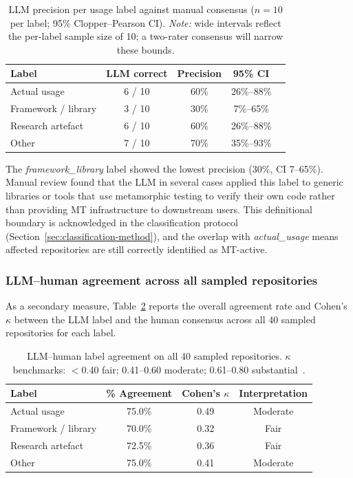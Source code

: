 \begin{table}[h]
\centering
\caption{LLM precision per usage label against manual consensus
         ($n = 10$ per label; 95\% Clopper–Pearson CI).
         \emph{Note:} wide intervals reflect the per-label sample size of 10;
         a two-rater consensus will narrow these bounds.}
\label{tab:llm-precision}
\begin{tabular}{lcccc}
\hline
\textbf{Label} & \textbf{LLM correct} & \textbf{Precision} & \textbf{95\% CI} \\
\hline
Actual usage         & 6 / 10 & 60\% & 26\%–88\% \\
Framework / library  & 3 / 10 & 30\% & 7\%–65\%  \\
Research artefact    & 6 / 10 & 60\% & 26\%–88\% \\
Other                & 7 / 10 & 70\% & 35\%–93\% \\
\hline
\end{tabular}
\end{table}

The \textit{framework\_library} label showed the lowest precision (30\%, CI 7–65\%).
Manual review found that the LLM in several cases applied this label to generic
libraries or tools that \emph{use} metamorphic testing to verify their own code
rather than providing MT infrastructure to downstream users.
This definitional boundary is acknowledged in the classification protocol
(Section~\ref{sec:classification-method}), and the overlap with \textit{actual\_usage}
means affected repositories are still correctly identified as MT-active.

\subsubsection*{LLM–human agreement across all sampled repositories}
As a secondary measure, Table~\ref{tab:llm-agreement} reports the overall agreement
rate and Cohen's~$\kappa$ between the LLM label and the human consensus
across all 40 sampled repositories for each label.

\begin{table}[h]
\centering
\caption{LLM–human label agreement on all 40 sampled repositories.
         $\kappa$ benchmarks: $<$0.40 fair; 0.41–0.60 moderate;
         0.61–0.80 substantial~\cite{landis1977}.}
\label{tab:llm-agreement}
\begin{tabular}{lccc}
\hline
\textbf{Label} & \textbf{\% Agreement} & \textbf{Cohen's $\kappa$} & \textbf{Interpretation} \\
\hline
Actual usage         & 75.0\% & 0.49 & Moderate \\
Framework / library  & 70.0\% & 0.32 & Fair     \\
Research artefact    & 72.5\% & 0.36 & Fair     \\
Other                & 75.0\% & 0.41 & Moderate \\
\hline
\end{tabular}
\end{table}

